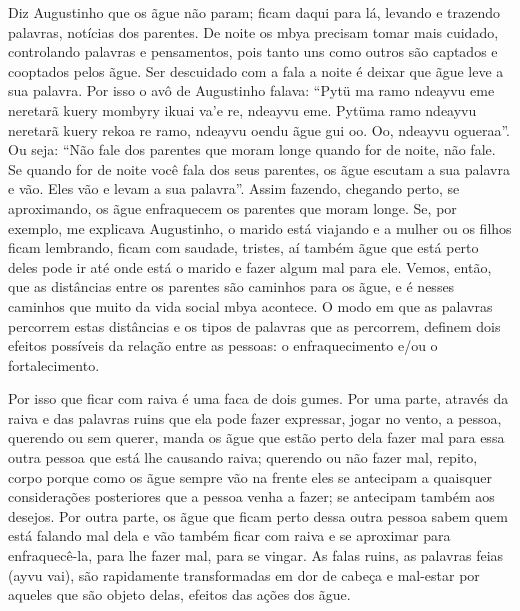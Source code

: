\documentclass{article}
\begin{document}
Diz Augustinho que os \~ague n\~ao param; ficam daqui para l\'a, levando
e trazendo palavras, not\'icias dos parentes. De noite os mbya precisam
tomar mais cuidado, controlando palavras e pensamentos, pois tanto uns
como outros s\~ao captados e cooptados pelos \~ague.  Ser descuidado
com a fala a noite \'e deixar que \~ague leve a sua palavra. Por isso o
av\^o de Augustinho falava: {\textquotedblleft}Pyt\"u ma ramo ndeayvu
eme neretar\~a kuery mombyry ikuai va{\textquoteright}e re, ndeayvu
eme. Pyt\"uma ramo ndeayvu neretar\~a kuery rekoa re ramo, ndeayvu
oendu \~ague gui oo. Oo, ndeayvu ogueraa{\textquotedblright}. Ou seja:
{\textquotedblleft}N\~ao fale dos parentes que moram longe quando for
de noite, n\~ao fale. Se quando for de noite voc\^e fala dos seus
parentes, os \~ague escutam a sua palavra e v\~ao. Eles v\~ao e levam a
sua palavra{\textquotedblright}. Assim fazendo, chegando perto, se
aproximando, os \~ague enfraquecem os parentes que moram longe. Se, por
exemplo, me explicava Augustinho, o marido est\'a viajando e a mulher
ou os filhos ficam lembrando, ficam com saudade, tristes, a\'i tamb\'em
\~ague que est\'a perto deles pode ir at\'e onde est\'a o marido e
fazer algum mal para ele. Vemos, ent\~ao, que as dist\^ancias entre os
parentes s\~ao caminhos para os \~ague, e \'e nesses caminhos que muito
da vida social mbya acontece. O modo em que as palavras percorrem estas
dist\^ancias e os tipos de palavras que as percorrem, definem dois
efeitos poss\'iveis da rela\c{c}\~ao entre as pessoas: o
enfraquecimento e/ou o fortalecimento.

Por isso que ficar com raiva \'e uma faca de dois gumes. Por uma parte,
atrav\'es da raiva e das palavras ruins que ela pode fazer expressar,
jogar no vento, a pessoa, querendo ou sem querer, manda os \~ague que
est\~ao perto dela fazer mal para essa outra pessoa que est\'a lhe
causando raiva; querendo ou n\~ao fazer mal, repito, corpo porque como
os \~ague sempre v\~ao na frente eles se antecipam a quaisquer
considera\c{c}\~oes posteriores que a pessoa venha a fazer; se
antecipam tamb\'em aos desejos.  Por outra parte, os \~ague que ficam
perto dessa outra pessoa sabem quem est\'a falando mal dela e v\~ao
tamb\'em ficar com raiva e se aproximar para enfraquec\^e-la, para lhe
fazer mal, para se vingar. As falas ruins, as palavras feias (ayvu
vai), s\~ao rapidamente transformadas em dor de cabe\c{c}a e mal-estar
por aqueles que s\~ao objeto delas, efeitos das a\c{c}\~oes dos \~ague.
\end{document}
